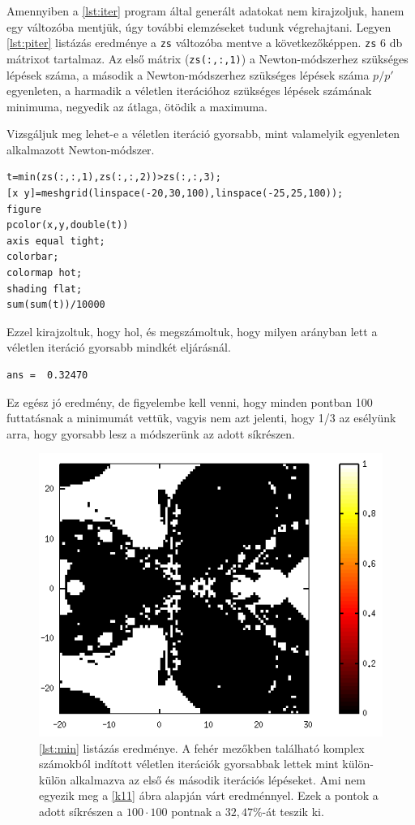 \documentclass[a4paper,12pt]{report}
\begin{document}
				Amennyiben a \ref{lst:iter} program által generált adatokat nem kirajzoljuk, hanem egy változóba mentjük, úgy további elemzéseket tudunk végrehajtani. Legyen \ref{lst:piter} listázás  eredménye a \texttt{zs} változóba mentve a következőképpen. \texttt{zs} 6 db mátrixot tartalmaz. Az első mátrix (\texttt{zs(:,:,1)}) a Newton-módszerhez szükséges lépések száma, a második a Newton-módszerhez szükséges lépések száma $p/p'$ egyenleten, a harmadik a véletlen iterációhoz szükséges lépések számának minimuma, negyedik az átlaga, ötödik a maximuma.

				Vizsgáljuk meg lehet-e a véletlen iteráció gyorsabb, mint valamelyik egyenleten alkalmazott Newton-módszer.
				\begin{lstlisting}[caption=Bemenet,label=lst:min]
t=min(zs(:,:,1),zs(:,:,2))>zs(:,:,3);
[x y]=meshgrid(linspace(-20,30,100),linspace(-25,25,100));
figure
pcolor(x,y,double(t))
axis equal tight;
colorbar;
colormap hot;
shading flat;
sum(sum(t))/10000
				\end{lstlisting}
				Ezzel kirajzoltuk, hogy hol, és megszámoltuk, hogy milyen arányban lett a véletlen iteráció gyorsabb mindkét eljárásnál. 
				\begin{lstlisting}[caption= Eredm\'eny]
ans =  0.32470
				\end{lstlisting}
				Ez egész jó eredmény, de figyelembe kell venni, hogy minden pontban 100 futtatásnak a minimumát vettük, vagyis nem azt jelenti, hogy 1/3 az esélyünk arra, hogy gyorsabb lesz a módszerünk az adott síkrészen.
				
				\begin{figure}[ht]
					\centering
					\includegraphics[scale=0.35]{min.png}
					\caption{\ref{lst:min} listázás eredménye. A fehér mezőkben található komplex számokból indított véletlen iterációk gyorsabbak lettek mint külön-külön alkalmazva az első és második iterációs lépéseket. Ami nem egyezik meg a \ref{k11} ábra alapján várt eredménnyel. Ezek a pontok a adott síkrészen a $100\cdot100$ pontnak a $32,\!47\%$-át teszik ki.}
				\end{figure}
\end{document}
